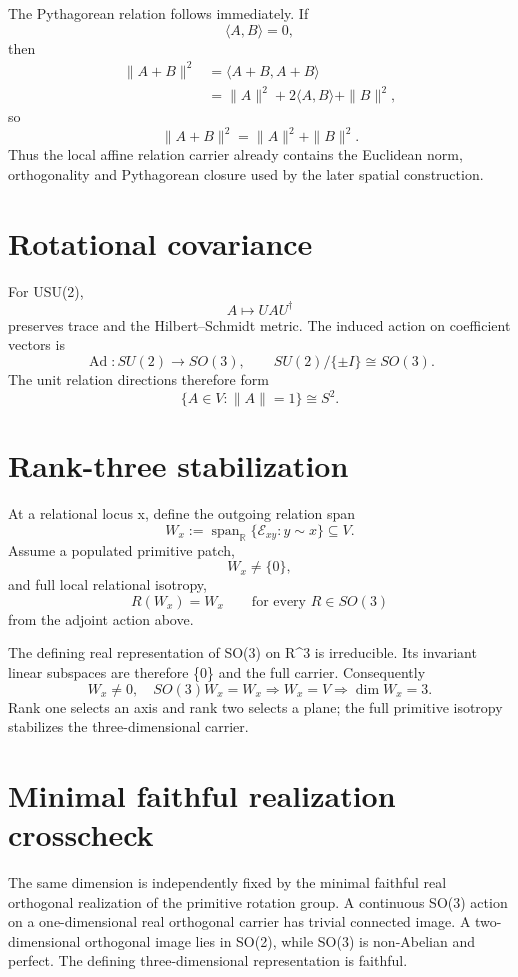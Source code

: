 \documentclass[11pt,a4paper,twoside]{book}
\def\({}%
\def\){}%
\theoremstyle{definition}
\begin{document}
The Pythagorean relation follows immediately. If
\[
\langle A,B\rangle=0,
\]
then
\[
\begin{aligned}
\|A+B\|^2
&=\langle A+B,A+B\rangle\\
&=\|A\|^2+2\langle A,B\rangle+\|B\|^2,
\end{aligned}
\]
so
\[
\boxed{\|A+B\|^2=\|A\|^2+\|B\|^2.}
\]
Thus the local affine relation carrier already contains the Euclidean norm,
orthogonality and Pythagorean closure used by the later spatial construction.

\section{Rotational covariance}

For \(U\in SU(2)\),
\[
A\mapsto UAU^\dagger
\]
preserves trace and the Hilbert--Schmidt metric.  The induced action on coefficient
vectors is
\[
\boxed{
\operatorname{Ad}:SU(2)\longrightarrow SO(3),
\qquad
SU(2)/\{\pm I\}\cong SO(3).
}
\]
The unit relation directions therefore form
\[
\boxed{
\{A\in V:\|A\|=1\}\cong S^2.
}
\]

\section{Rank-three stabilization}

At a relational locus \(x\), define the outgoing relation span
\[
W_x
:=
\operatorname{span}_{\mathbb R}
\{\mathcal E_{xy}:y\sim x\}
\subseteq V.
\]
Assume a populated primitive patch,
\[
W_x\neq\{0\},
\]
and full local relational isotropy,
\[
R(W_x)=W_x
\qquad
\text{for every }R\in SO(3)
\]
from the adjoint action above.

The defining real representation of \(SO(3)\) on \(\mathbb R^3\) is irreducible.
Its invariant linear subspaces are therefore \(\{0\}\) and the full carrier.
Consequently
\[
\boxed{
W_x\neq0,\quad SO(3)W_x=W_x
\Longrightarrow
W_x=V
\Longrightarrow
\dim W_x=3.
}
\]
Rank one selects an axis and rank two selects a plane; the full primitive isotropy
stabilizes the three-dimensional carrier.

\section{Minimal faithful realization crosscheck}

The same dimension is independently fixed by the minimal faithful real orthogonal
realization of the primitive rotation group. A continuous \(SO(3)\) action on a
one-dimensional real orthogonal carrier has trivial connected image.  A
two-dimensional orthogonal image lies in \(SO(2)\), while \(SO(3)\) is non-Abelian
and perfect.  The defining three-dimensional representation is faithful.
\end{document}
